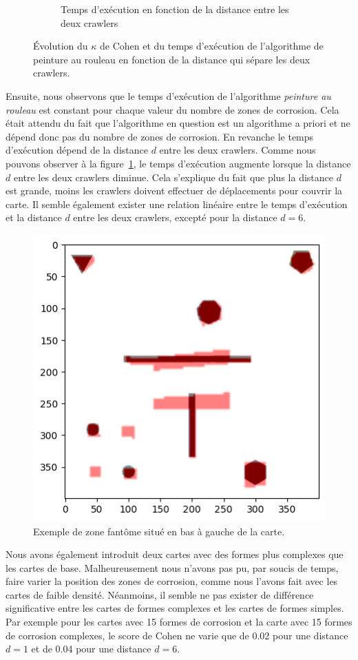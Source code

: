 \documentclass[francais,RandD]{rapportPFE}
\begin{document}
\begin{figure}[h!]
\begin{subfigure}[t]{0.49\linewidth}
						\caption{Temps d'exécution en fonction de la distance entre les deux crawlers}
						\label{fig:peinture_au_rouleau-time_vs_distance}
				\end{subfigure}
				\caption{Évolution du $\kappa$ de Cohen et du temps d'exécution de l'algorithme de peinture au rouleau en fonction de la distance qui sépare les deux crawlers.}
				\label{fig:peinture_au_rouleau-distance}
			\end{figure}

			Ensuite, nous observons que le temps d'exécution de l'algorithme \textit{peinture au rouleau} est constant pour chaque valeur du nombre de zones de corrosion.
			Cela était attendu du fait que l'algorithme en question est un algorithme a priori et ne dépend donc pas du nombre de zones de corrosion.
			En revanche le temps d'exécution dépend de la distance $d$ entre les deux crawlers.
			Comme nous pouvons observer à la figure~\ref{fig:peinture_au_rouleau-time_vs_distance}, le temps d'exécution augmente lorsque la distance $d$ entre les deux crawlers diminue.
			Cela s'explique du fait que plus la distance $d$ est grande, moins les crawlers doivent effectuer de déplacements pour couvrir la carte.
			Il semble également exister une relation linéaire entre le temps d'exécution et la distance $d$ entre les deux crawlers, excepté pour la distance $d = 6$.

			\begin{figure}[h!]
				\centering
				\includegraphics[width=0.5\linewidth]{graphics/output.png}
				\caption{Exemple de zone fantôme situé en bas à gauche de la carte.}
				\label{fig:ghost_zone}
			\end{figure}

			Nous avons également introduit deux cartes avec des formes plus complexes que les cartes de base.
			Malheureusement nous n'avons pas pu, par soucis de temps, faire varier la position des zones de corrosion, comme nous l'avons fait avec les cartes de faible densité.
			Néanmoins, il semble ne pas exister de différence significative entre les cartes de formes complexes et les cartes de formes simples.
			Par exemple pour les cartes avec 15 formes de corrosion et la carte avec 15 formes de corrosion complexes, le score de Cohen ne varie que de 0.02 pour une distance $d = 1$ et de 0.04 pour une distance $d = 6$.
\end{document}
